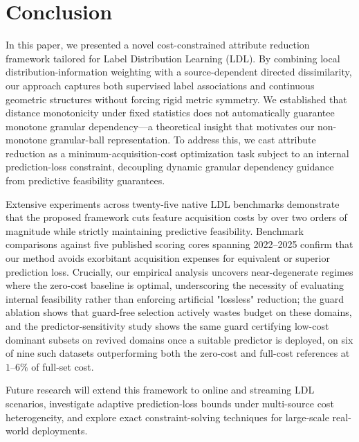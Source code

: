 \section{Conclusion}
\label{sec:conclusion}

In this paper, we presented a novel cost-constrained attribute reduction framework tailored for Label Distribution Learning (LDL). By combining local distribution-information weighting with a source-dependent directed dissimilarity, our approach captures both supervised label associations and continuous geometric structures without forcing rigid metric symmetry. We established that distance monotonicity under fixed statistics does not automatically guarantee monotone granular dependency—a theoretical insight that motivates our non-monotone granular-ball representation. To address this, we cast attribute reduction as a minimum-acquisition-cost optimization task subject to an internal prediction-loss constraint, decoupling dynamic granular dependency guidance from predictive feasibility guarantees. 

Extensive experiments across twenty-five native LDL benchmarks demonstrate that the proposed framework cuts feature acquisition costs by over two orders of magnitude while strictly maintaining predictive feasibility. Benchmark comparisons against five published scoring cores spanning 2022--2025 confirm that our method avoids exorbitant acquisition expenses for equivalent or superior prediction loss. Crucially, our empirical analysis uncovers near-degenerate regimes where the zero-cost baseline is optimal, underscoring the necessity of evaluating internal feasibility rather than enforcing artificial "lossless" reduction; the guard ablation shows that guard-free selection actively wastes budget on these domains, and the predictor-sensitivity study shows the same guard certifying low-cost dominant subsets on revived domains once a suitable predictor is deployed, on six of nine such datasets outperforming both the zero-cost and full-cost references at $1$--$6\%$ of full-set cost.

Future research will extend this framework to online and streaming LDL scenarios, investigate adaptive prediction-loss bounds under multi-source cost heterogeneity, and explore exact constraint-solving techniques for large-scale real-world deployments.
